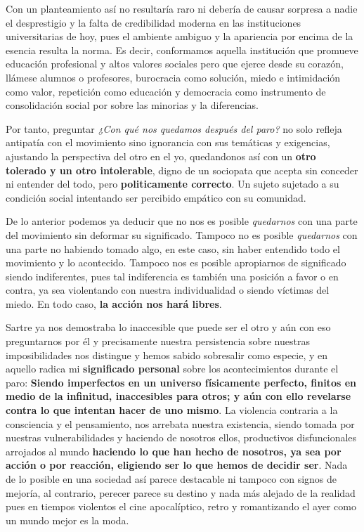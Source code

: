 Con un planteamiento así no resultaría raro ni debería de causar sorpresa a
nadie el desprestigio y la falta de credibilidad moderna en las instituciones
universitarias de hoy, pues el ambiente ambiguo y la apariencia por encima de la
esencia resulta la norma. Es decir, conformamos aquella institución que promueve
educación profesional y altos valores sociales pero que ejerce desde su corazón,
llámese alumnos o profesores, burocracia como solución, miedo e intimidación
como valor, repetición como educación y democracia como instrumento de
consolidación social por sobre las minorias y la diferencias.

Por tanto, preguntar \emph{¿Con qué nos quedamos después del paro?} no solo
refleja antipatía con el movimiento sino ignorancia con sus temáticas y
exigencias, ajustando la perspectiva del otro en el yo, quedandonos así con un
\textbf{otro tolerado y un otro intolerable}, digno de un sociopata que acepta
sin conceder ni entender del todo, pero \textbf{politicamente correcto}. Un
sujeto sujetado a su condición social intentando ser percibido empático con su
comunidad.

De lo anterior podemos ya deducir que no nos es posible \emph{quedarnos} con una
parte del movimiento sin deformar su significado. Tampoco no es posible
\emph{quedarnos} con una parte no habiendo tomado algo, en este caso, sin haber
entendido todo el movimiento y lo acontecido. Tampoco nos es posible apropiarnos
de significado siendo indiferentes, pues tal indiferencia es también una
posición a favor o en contra, ya sea violentando con nuestra individualidad o
siendo víctimas del miedo. En todo caso, \textbf{la acción nos hará libres}.

Sartre ya nos demostraba lo inaccesible que puede ser el otro y aún con eso
preguntarnos por él y precisamente nuestra persistencia sobre nuestras
imposibilidades nos distingue y hemos sabido sobresalir como especie, y en
aquello radica mi \textbf{significado personal} sobre los acontecimientos
durante el paro: \textbf{Siendo imperfectos en un universo físicamente perfecto,
finitos en medio de la infinitud, inaccesibles para otros; y aún con ello
revelarse contra lo que intentan hacer de uno mismo}. La violencia contraria a
la consciencia y el pensamiento, nos arrebata nuestra existencia, siendo tomada
por nuestras vulnerabilidades y haciendo de nosotros ellos, productivos
disfuncionales arrojados al mundo \textbf{haciendo lo que han hecho de nosotros,
ya sea por acción o por reacción, eligiendo ser lo que hemos de decidir ser}.
Nada de lo posible en una sociedad así parece destacable ni tampoco con signos
de mejoría, al contrario, perecer parece su destino y nada más alejado de la
realidad pues en tiempos violentos el cine apocalíptico, retro y romantizando el
ayer como un mundo mejor es la moda.

